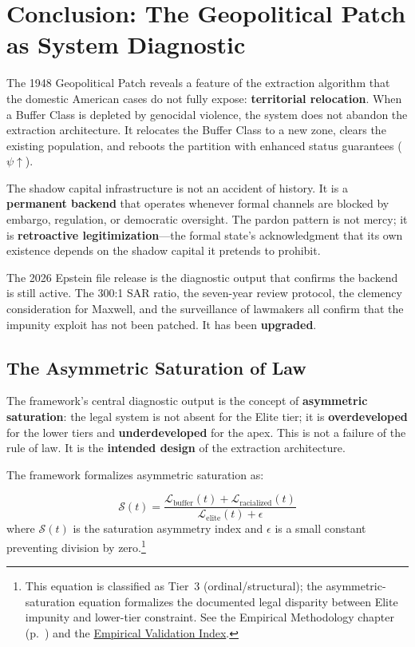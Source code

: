 \section{Conclusion: The Geopolitical Patch as System Diagnostic}

The 1948 Geopolitical Patch reveals a feature of the extraction algorithm that the domestic American cases do not fully expose: \textbf{territorial relocation}. When a Buffer Class is depleted by genocidal violence, the system does not abandon the extraction architecture. It relocates the Buffer Class to a new zone, clears the existing population, and reboots the partition with enhanced status guarantees ($\psi \uparrow$).

The shadow capital infrastructure is not an accident of history. It is a \textbf{permanent backend} that operates whenever formal channels are blocked by embargo, regulation, or democratic oversight. The pardon pattern is not mercy; it is \textbf{retroactive legitimization}---the formal state's acknowledgment that its own existence depends on the shadow capital it pretends to prohibit.

The 2026 Epstein file release is the diagnostic output that confirms the backend is still active. The 300:1 SAR ratio, the seven-year review protocol, the clemency consideration for Maxwell, and the surveillance of lawmakers all confirm that the impunity exploit has not been patched. It has been \textbf{upgraded}.

\subsection{The Asymmetric Saturation of Law}

The framework's central diagnostic output is the concept of \textbf{asymmetric saturation}: the legal system is not absent for the Elite tier; it is \textbf{overdeveloped} for the lower tiers and \textbf{underdeveloped} for the apex. This is not a failure of the rule of law. It is the \textbf{intended design} of the extraction architecture.

The framework formalizes asymmetric saturation as:

\begin{equation}\label{eq:gp16b-asymmetric-saturation}
\mathcal{S}(t) = \frac{\mathcal{L}_{\text{buffer}}(t) + \mathcal{L}_{\text{racialized}}(t)}{\mathcal{L}_{\text{elite}}(t) + \epsilon}
\end{equation}
where $\mathcal{S}(t)$ is the saturation asymmetry index and $\epsilon$ is a small constant preventing division by zero.\footnote{This equation is classified as Tier~3 (ordinal/structural); the asymmetric-saturation equation formalizes the documented legal disparity between Elite impunity and lower-tier constraint. See the Empirical Methodology chapter (p.~\pageref{ch:empirical_methodology}) and the \hyperref[app:empirical_index]{Empirical Validation Index}.}

